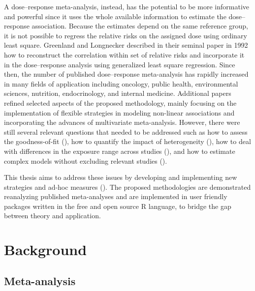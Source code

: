 \documentclass[11pt,a4paper,twoside,openany]{book}\usepackage{knitr}
\begin{document}
{A dose--response meta-analysis, instead, has the potential to be more informative and powerful since it uses the whole available information to estimate the dose--response association. Because the estimates depend on the same reference group, it is not possible to regress the relative risks on the assigned dose using ordinary least square. Greenland and Longnecker described in their seminal paper in 1992 how to reconstruct the correlation within set of relative risks and incorporate it in the dose--response analysis using generalized least square regression. Since then, the number of published dose--response meta-analysis has rapidly increased in many fields of application including oncology, public health, environmental sciences, nutrition, endocrinology, and internal medicine. 
Additional papers refined selected aspects of the proposed methodology, mainly focusing on the implementation of flexible strategies in modeling non-linear associations and incorporating the advances of multivariate meta-analysis. However, there were still several relevant questions that needed to be addressed such as how to assess the goodness-of-fit (), how to quantify the impact of heterogeneity (), how to deal with differences in the exposure range across studies (), and how to estimate complex models without excluding relevant studies ().

This thesis aims to address these issues by developing and implementing new strategies and ad-hoc measures (). The proposed methodologies are demonstrated reanalyzing published meta-analyses and are implemented in user friendly packages written in the free and open source R language, to bridge the gap between theory and application.


%

\chapter{Background}

\section{Meta-analysis}

}
\end{document}
